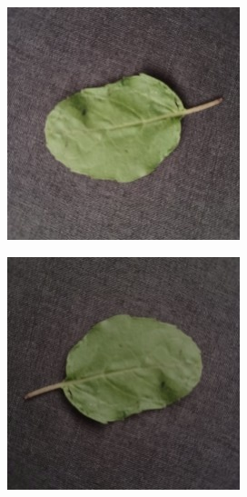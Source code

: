 \documentclass[twocolumn]{article}
\begin{document}
\begin{figure}[H]
    \begin{subfigure}[b]{0.30\columnwidth}
        \includegraphics[width=\textwidth]{tulsi4}
    \end{subfigure}
    \hfill
    \begin{subfigure}[b]{0.30\columnwidth}
        \includegraphics[width=\textwidth]{tulsi5}

\end{subfigure}
\end{figure}
\end{document}
